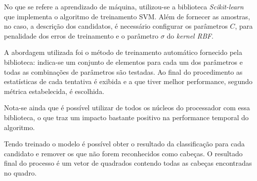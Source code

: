 No que se refere a aprendizado de máquina, utilizou-se a biblioteca \textit{Scikit-learn} \cite{scikit-learn} que implementa o algoritmo de treinamento SVM. Além de fornecer as amostras, no caso, a descrição dos candidatos, é necessário configurar os parâmetros $C$, para penalidade dos erros de treinamento e o parâmetro $\sigma$ do \textit{kernel RBF}. 

A abordagem utilizada foi o método de treinamento automático fornecido pela biblioteca: indica-se um conjunto de elementos para cada um dos parâmetros e todas as combinações de parâmetros são testadas. Ao final do procedimento as estatísticas de cada tentativa é exibida e a que tiver melhor performance, segundo métrica estabelecida, é escolhida.

Nota-se ainda que é possível utilizar de todos os núcleos do processador com essa biblioteca, o que traz um impacto bastante positivo na performance temporal do algoritmo.

Tendo treinado o modelo é possível obter o resultado da classificação para cada candidato e remover os que não forem reconhecidos como cabeças. O resultado final do processo é um vetor de quadrados contendo todas as cabeças encontradas no quadro.

